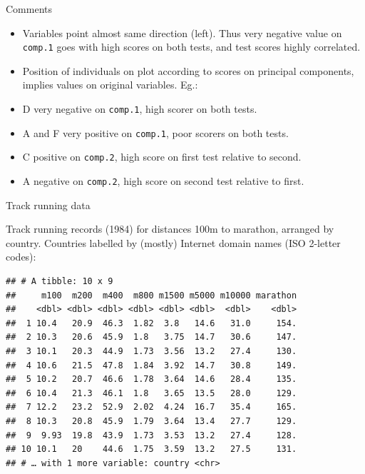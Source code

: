 \documentclass[ignorenonframetext,]{beamer}
\newenvironment{Shaded}{\begin{snugshade}}{\end{snugshade}}
\newcommand{\DecValTok}[1]{\textcolor[rgb]{0.00,0.00,0.81}{#1}}
\newcommand{\KeywordTok}[1]{\textcolor[rgb]{0.13,0.29,0.53}{\textbf{#1}}}
\newcommand{\NormalTok}[1]{#1}
\newcommand{\OperatorTok}[1]{\textcolor[rgb]{0.81,0.36,0.00}{\textbf{#1}}}
\newcommand{\StringTok}[1]{\textcolor[rgb]{0.31,0.60,0.02}{#1}}
\begin{document}
\begin{frame}[fragile]{Comments}
\protect\hypertarget{comments-29}{}

\begin{itemize}
\item
  Variables point almost same direction (left). Thus very negative value
  on \texttt{comp.1} goes with high scores on both tests, and test
  scores highly correlated.
\item
  Position of individuals on plot according to scores on principal
  components, implies values on original variables. Eg.:
\item
  D very negative on \texttt{comp.1}, high scorer on both tests.
\item
  A and F very positive on \texttt{comp.1}, poor scorers on both tests.
\item
  C positive on \texttt{comp.2}, high score on first test relative to
  second.
\item
  A negative on \texttt{comp.2}, high score on second test relative to
  first.
\end{itemize}

\end{frame}

\begin{frame}[fragile]{Track running data}
\protect\hypertarget{track-running-data}{}

Track running records (1984) for distances 100m to marathon, arranged by
country. Countries labelled by (mostly) Internet domain names (ISO
2-letter codes):

\scriptsize

\begin{Shaded}
\end{Shaded}

\begin{verbatim}
## # A tibble: 10 x 9
##     m100  m200  m400  m800 m1500 m5000 m10000 marathon
##    <dbl> <dbl> <dbl> <dbl> <dbl> <dbl>  <dbl>    <dbl>
##  1 10.4   20.9  46.3  1.82  3.8   14.6   31.0     154.
##  2 10.3   20.6  45.9  1.8   3.75  14.7   30.6     147.
##  3 10.1   20.3  44.9  1.73  3.56  13.2   27.4     130.
##  4 10.6   21.5  47.8  1.84  3.92  14.7   30.8     149.
##  5 10.2   20.7  46.6  1.78  3.64  14.6   28.4     135.
##  6 10.4   21.3  46.1  1.8   3.65  13.5   28.0     129.
##  7 12.2   23.2  52.9  2.02  4.24  16.7   35.4     165.
##  8 10.3   20.8  45.9  1.79  3.64  13.4   27.7     129.
##  9  9.93  19.8  43.9  1.73  3.53  13.2   27.4     128.
## 10 10.1   20    44.6  1.75  3.59  13.2   27.5     131.
## # … with 1 more variable: country <chr>
\end{verbatim}

\normalsize

\end{frame}
\end{document}
